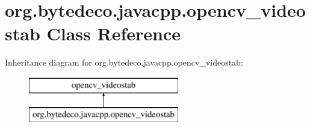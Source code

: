 \hypertarget{classorg_1_1bytedeco_1_1javacpp_1_1opencv__videostab}{}\section{org.\+bytedeco.\+javacpp.\+opencv\+\_\+videostab Class Reference}
\label{classorg_1_1bytedeco_1_1javacpp_1_1opencv__videostab}
Inheritance diagram for org.\+bytedeco.\+javacpp.\+opencv\+\_\+videostab\+:\begin{figure}[H]
\begin{center}
\leavevmode
\includegraphics[height=2.000000cm]{classorg_1_1bytedeco_1_1javacpp_1_1opencv__videostab}
\end{center}
\end{figure}
